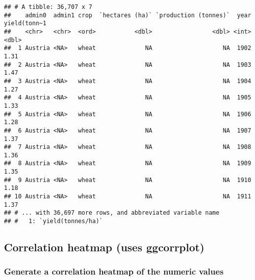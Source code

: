 \documentclass[
]{article}
\begin{document}
\begin{verbatim}
## # A tibble: 36,707 x 7
##    admin0  admin1 crop  `hectares (ha)` `production (tonnes)`  year yield(tonn~1
##    <chr>   <chr>  <ord>           <dbl>                 <dbl> <int>        <dbl>
##  1 Austria <NA>   wheat              NA                    NA  1902         1.31
##  2 Austria <NA>   wheat              NA                    NA  1903         1.47
##  3 Austria <NA>   wheat              NA                    NA  1904         1.27
##  4 Austria <NA>   wheat              NA                    NA  1905         1.33
##  5 Austria <NA>   wheat              NA                    NA  1906         1.28
##  6 Austria <NA>   wheat              NA                    NA  1907         1.37
##  7 Austria <NA>   wheat              NA                    NA  1908         1.36
##  8 Austria <NA>   wheat              NA                    NA  1909         1.35
##  9 Austria <NA>   wheat              NA                    NA  1910         1.18
## 10 Austria <NA>   wheat              NA                    NA  1911         1.37
## # ... with 36,697 more rows, and abbreviated variable name
## #   1: `yield(tonnes/ha)`
\end{verbatim}

\hypertarget{correlation-heatmap-uses-ggcorrplot}{%
\subsection{Correlation heatmap (uses
ggcorrplot)}\label{correlation-heatmap-uses-ggcorrplot}}

\hypertarget{generate-a-correlation-heatmap-of-the-numeric-values}{%
\subsubsection{Generate a correlation heatmap of the numeric
values}\label{generate-a-correlation-heatmap-of-the-numeric-values}}
\end{document}
